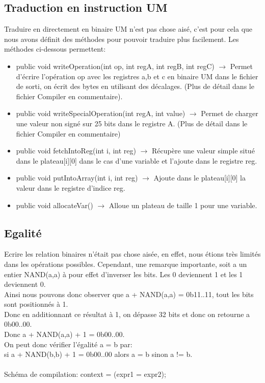 \documentclass[a4paper,12pt]{report}
\begin{document}
\subsection{Traduction en instruction UM}
Traduire en directement en binaire UM n'est pas chose aisé, c'est pour cela que nous avons définit des méthodes pour pouvoir traduire
plus facilement.
Les méthodes ci-dessous permettent:
\begin{itemize}
 \item public void writeOperation(int op, int regA, int regB, int regC) $\rightarrow$ Permet d'écrire l'opération op avec les registres
 a,b et c en binaire UM dans le fichier de sorti, on écrit des bytes en utilisant des décalages. (Plus de détail dans le fichier Compiler
 en commentaire).
 \item public void writeSpecialOperation(int regA, int value) $\rightarrow$ Permet de charger une valeur non signé sur 25 bits dans 
 le registre A. (Plus de détail dans le fichier Compiler en commentaire)
 \item public void fetchIntoReg(int i, int reg) $\rightarrow$ Récupère une valeur simple situé dans le plateau[i][0] dans le cas d'une variable
 et l'ajoute dans le registre reg.
 \item public void putIntoArray(int i, int reg) $\rightarrow$ Ajoute dans le plateau[i][0] la valeur dans le registre d'indice reg.
 \item public void allocateVar() $\rightarrow$ Alloue un plateau de taille 1 pour une variable.
\end{itemize}

\subsection{Egalité}
Ecrire les relation binaires n'était pas chose aisée, en effet, nous étions très limités dans les opérations possibles.
Cependant, une remarque importante, soit a un entier NAND(a,a) à pour effet d'inverser les bits. Les 0 deviennent 1 et les 1 deviennent
0. \\
Ainsi nous pouvons donc observer que a + NAND(a,a) = 0b11..11, tout les bits sont positionnés à 1. \\
Donc en additionnant ce résultat à 1, on dépasse 32 bits et donc on retourne a 0b00..00. \\
Donc a + NAND(a,a) + 1 = 0b00..00. \\
On peut donc vérifier l'égalité a = b par: \\
si a + NAND(b,b) + 1 = 0b00..00 alors a = b sinon a != b.
\\ \\
Schéma de compilation: context = (expr1 = expr2);
\end{document}
